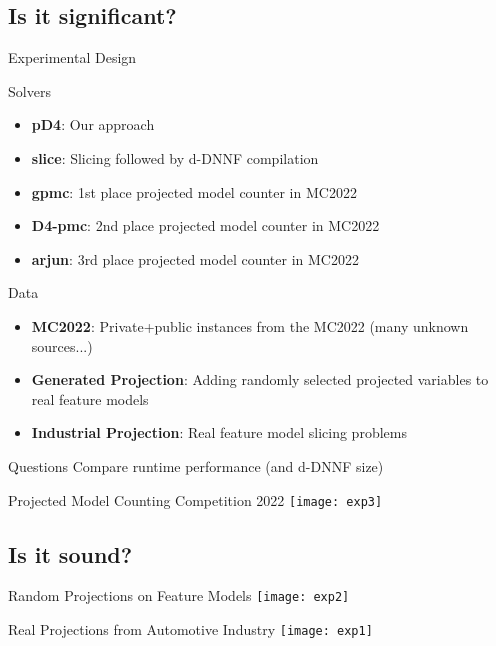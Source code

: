 \documentclass[
	aspectratio=169, %
	8pt, %
]{beamer}
\begin{document}
\subsection{Is it significant?}
\begin{frame}{\insertsubsection\hfill{}Experimental Design}
	\begin{block}{Solvers}
		\begin{itemize}
			\item {\bf pD4}: Our approach
			\item {\bf slice}: Slicing followed by d-DNNF compilation
			\item {\bf gpmc}: 1st place projected model counter in MC2022
			\item {\bf D4-pmc}: 2nd place projected model counter in MC2022
			\item {\bf arjun}: 3rd place projected model counter in MC2022
		\end{itemize}
	\end{block}
	\begin{block}{Data}
		\begin{itemize}
			\item {\bf MC2022}: Private+public instances from the MC2022 (many unknown sources...)
			\item {\bf Generated Projection}: Adding randomly selected projected variables to real feature models
			\item {\bf Industrial Projection}: Real feature model slicing problems
		\end{itemize}
	\end{block}
	\begin{block}{Questions}
		Compare runtime performance (and d-DNNF size)
	\end{block}
\end{frame}

\begin{frame}{\insertsubsection\hfill{}Projected Model Counting Competition 2022}
	\texttt{[image: exp3]}
\end{frame}

\subsection{Is it sound?}
\begin{frame}{\insertsubsection\hfill{}Random Projections on Feature Models}
	\centering\texttt{[image: exp2]}
\end{frame}
\begin{frame}{\insertsubsection\hfill{}Real Projections from Automotive Industry}
	\centering\texttt{[image: exp1]}
\end{frame}
\end{document}
